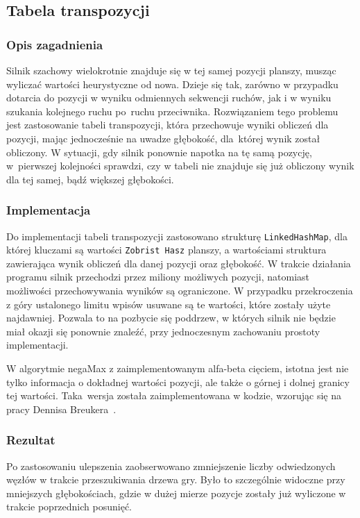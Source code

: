 \subsection{Tabela transpozycji}
\label{subsec:tabela-transpozycji}

\subsubsection{Opis zagadnienia}
Silnik szachowy wielokrotnie znajduje się w tej samej pozycji planszy, musząc wyliczać wartości heurystyczne od nowa.
Dzieje się tak, zarówno w przypadku dotarcia do pozycji w wyniku odmiennych sekwencji ruchów, jak i w wyniku szukania kolejnego ruchu po~ruchu przeciwnika.
Rozwiązaniem tego problemu jest zastosowanie tabeli transpozycji, która przechowuje wyniki obliczeń dla pozycji, mając jednocześnie na uwadze głębokość, dla~której wynik został obliczony.
W sytuacji, gdy silnik ponownie napotka na tę samą pozycję, w~pierwszej kolejności sprawdzi, czy w tabeli nie znajduje się już obliczony wynik dla tej samej, bądź większej głębokości.

\subsubsection{Implementacja}
Do implementacji tabeli transpozycji zastosowano strukturę \texttt{LinkedHashMap}, dla której kluczami są wartości \texttt{Zobrist Hasz} planszy, a wartościami struktura zawierająca wynik obliczeń dla danej pozycji oraz głębokość.
W trakcie działania programu silnik przechodzi przez miliony możliwych pozycji, natomiast możliwości przechowywania wyników są ograniczone.
W przypadku przekroczenia z góry ustalonego limitu wpisów usuwane są te wartości, które zostały użyte najdawniej.
Pozwala to na pozbycie się poddrzew, w których silnik nie będzie miał okazji się ponownie znaleźć, przy jednoczesnym zachowaniu prostoty implementacji.

W algorytmie negaMax z zaimplementowanym alfa-beta cięciem, istotna jest nie tylko informacja o dokładnej wartości pozycji, ale także o górnej i dolnej granicy tej wartości.
Taka~wersja została zaimplementowana w kodzie, wzorując się na pracy Dennisa Breukera~\cite*{transposition-phd}.

\subsubsection{Rezultat}
Po zastosowaniu ulepszenia zaobserwowano zmniejszenie liczby odwiedzonych węzłów w trakcie przeszukiwania drzewa gry.
Było to szczególnie widoczne przy mniejszych głębokościach, gdzie w dużej mierze pozycje zostały już wyliczone w trakcie poprzednich posunięć.

